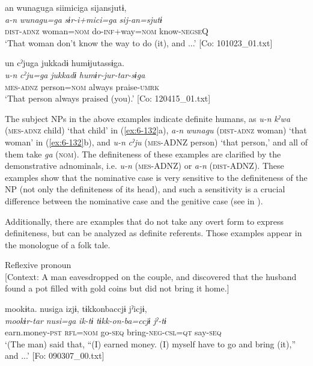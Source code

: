 \ex
{\TM}
\glll an  wunaguga  siimiciga  sijansjutɨ,\\
\textit{a-n}  \textit{wunagu=ga}  \textit{sɨr-i+mici=ga}  \textit{sij-an=sjutɨ}\\
\textsc{dist}-\textsc{adnz}  woman=\textsc{nom}  do-\textsc{inf}+way=\textsc{nom}  know-\textsc{negseQ}\\
\glt ‘That woman don’t know the way to do (it), and ...’ [Co: 101023\_01.txt]

\ex
{\TM}
\glll un  cˀjuga  jukkadɨ  humɨjutassɨga.\\
\textit{u-n}  \textit{cˀju=ga}  \textit{jukkadɨ}  \textit{humɨr-jur-tar-sɨga}\\
\textsc{mes}-\textsc{adnz}  person=\textsc{nom}  always  praise-\textsc{umrk}\\
\glt ‘That person always praised (you).’ [Co: 120415\_01.txt]
\z
\z

The subject NPs in the above examples indicate definite humans, as \textit{u-n} \textit{kˀwa} (\textsc{mes}-\textsc{adnz} child) ‘that child’ in (\ref{ex:6-132}a), \textit{a-n} \textit{wunagu} (\textsc{dist}-\textsc{adnz} woman) ‘that woman’ in (\ref{ex:6-132}b), and \textit{u-n} \textit{cˀju} (\textsc{mes}-ADNZ person) ‘that person,’ and all of them take \textit{ga} (\textsc{nom}). The definiteness of these examples are clarified by the demonstrative adnominals, i.e. \textit{u-n} (\textsc{mes}-ADNZ) or \textit{a-n} (\textsc{dist}-ADNZ). These examples show that the nominative case is very sensitive to the definiteness of the NP (not only the definiteness of its head), and such a sensitivity is a crucial difference between the nominative case and the genitive case (see  in ).

  Additionally, there are examples that do not take any overt form to express definiteness, but can be analyzed as definite referents. Those examples appear in the monologue of a folk tale.

\ea\label{ex:6-133}
 \ea Reflexive pronoun\\{}
[Context: A man eavesdropped on the couple, and discovered that the husband found a pot filled with gold coins but did not bring it home.]

{\TM}
\glll mookɨta.  nusiga  izjɨ,  tɨkkonbaccjɨ  jˀicjɨ,\\
      \textit{mookɨr-tar}  \textit{nusi=ga}  \textit{ik-tɨ}  \textit{tɨkk-on-ba=ccjɨ}  \textit{jˀ-tɨ}\\
      earn.money-\textsc{pst}  \textsc{rfl}=\textsc{nom}  go-\textsc{seq}  bring-\textsc{neg}-\textsc{csl}=\textsc{qt}  say-\textsc{seq}\\
\glt ‘(The man) said that, “(I) earned money. (I) myself have to go and bring (it),” and ...’ [Fo: 090307\_00.txt]

